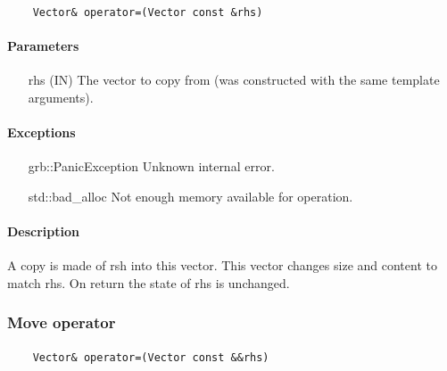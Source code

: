 \paragraph{\syntax}

\begin{verbatim}
    Vector& operator=(Vector const &rhs)
\end{verbatim}

\paragraph{Parameters}

\begin{itemize}[leftmargin=1.1in]
    \item[{\sf rhs}] ({\sf IN}) The vector to copy from (was constructed with the same template arguments).
\end{itemize}

\paragraph{Exceptions}

\begin{itemize}[leftmargin=2.1in]
    \item[{\sf grb::PanicException}]   Unknown internal error.
    \item[{\sf std::bad\_alloc}]        Not enough memory available for operation.
\end{itemize}

\paragraph{Description}

A copy is made of {\sf rsh} into this vector.  This vector changes size and content to match {\sf rhs}.
On return the state of {\sf rhs} is unchanged.



\subsubsection{Move operator}

\paragraph{\syntax}

\begin{verbatim}
    Vector& operator=(Vector const &&rhs)
\end{verbatim}

